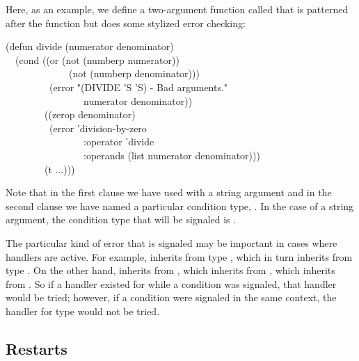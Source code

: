 Here, as an example,
we define a two-argument function called  that is patterned after
the \cdf{/} function but does some stylized error checking:
\begin{lisp}
(defun divide (numerator denominator) \\
~~(cond ((or (not (numberp numerator)) \\
~~~~~~~~~~~~~(not (numberp denominator))) \\
~~~~~~~~~(error "(DIVIDE '{\Xtilde}S '{\Xtilde}S) - Bad arguments." \\
~~~~~~~~~~~~~~~~numerator denominator)) \\
~~~~~~~~((zerop denominator) \\
~~~~~~~~~(error 'division-by-zero \\
~~~~~~~~~~~~~~~~:operator 'divide \\
~~~~~~~~~~~~~~~~:operands (list numerator denominator))) \\
~~~~~~~~(t ...)))
\end{lisp}
Note that in the first clause we have used  with a string argument
and in the second clause we have named a particular condition type,
. In the case of a string argument, the condition type that
will be signaled is .

The particular kind of error that is signaled may be important
in cases where handlers are active. For example,  inherits 
from type , which in turn inherits from type . On the 
other hand,  inherits from , which 
inherits from , which inherits from . So if a handler
existed for  while a  condition was
signaled, that handler would be tried; however, if a 
condition were signaled in the same context, the handler for type
 would not be tried.

\subsection{Restarts}
\label{RESTARTS}

